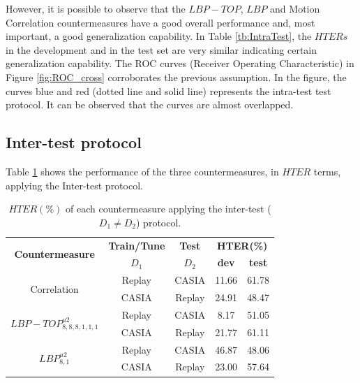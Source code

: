 However, it is possible to observe that the $LBP-TOP$, $LBP$ and Motion Correlation countermeasures have a good overall performance and, most important, a good generalization capability. In Table \ref{tb:IntraTest}, the $HTERs$ in the development and in the test set are very similar indicating certain generalization capability. The ROC curves (Receiver Operating Characteristic) in Figure \ref{fig:ROC_cross} corroborates the previous assumption. In the figure, the curves blue and red (dotted line and solid line) represents the intra-test test protocol. It can be observed that the curves are almost overlapped.

\subsection{Inter-test protocol}
\label{sec:Inter_test}

Table \ref{tb:InterTest} shows the performance of the three countermeasures, in $HTER$ terms, applying the Inter-test protocol.

\hspace{-17mm}\begin{table}[ht!]
\caption{$HTER(\%)$ of each countermeasure applying the inter-test ($D_1 \neq D_2$) protocol.}
\begin{center}
  \begin{tabular}{ | c | c | c | c  c | }
    \hline

   \multirow{2}{*}{\textbf{Countermeasure}} & \textbf{Train/Tune} & \textbf{Test} & \multicolumn{2}{c|}{\textbf{HTER(\%)}} \\ 
     & $D_1$ & $D_2$ & \textbf{dev} & \textbf{test}  \\ \hline
    
    \multirow{2}{*}{Correlation} &  Replay & CASIA & 11.66 & 61.78  \\ 
               & CASIA  & Replay & 24.91 & 48.47  \\ \hline \hline

    \multirow{2}{*}{$LBP-TOP_{8,8,8,1,1,1}^{u2}$}  &  Replay  & CASIA  & 8.17 & 51.05   \\
               & CASIA  & Replay & 21.77 & 61.11   \\ \hline \hline

    \multirow{2}{*}{$LBP_{8,1}^{u2}$} &  Replay  & CASIA  & 46.87  & 48.06   \\
               & CASIA  & Replay & 23.00 & 57.64  \\
            
    \hline
  \end{tabular}
\end{center}
\label{tb:InterTest}
\end{table}

